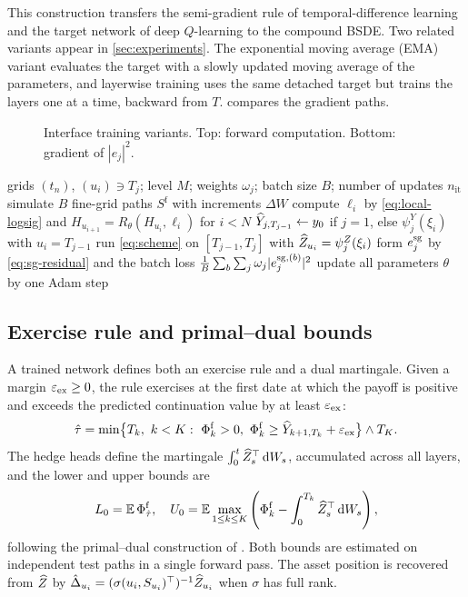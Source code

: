 This construction transfers the semi-gradient rule of temporal-difference learning and the target network of deep $Q$-learning \cite{sutton2018,mnih2015} to the compound BSDE. Two related variants appear in \cref{sec:experiments}. The exponential moving average (EMA) variant evaluates the target with a slowly updated moving average of the parameters, and layerwise training uses the same detached target but trains the layers one at a time, backward from $T$.  compares the gradient paths.

\begin{figure}[htbp]
\centering
\resizebox{\textwidth}{!}{}
\caption{Interface training variants. Top: forward computation. Bottom: gradient of $|e_j|^2$.}
\label{fig:interface}
\end{figure}

\begin{algorithm}[htbp]
\caption{Stop-gradient training of the log-signature compound BSDE}
\label{alg:train}
\begin{algorithmic}[1]
\Require grids $(t_n)$, $(u_i)\ni T_j$; level $M$; weights $\omega_j$; batch size $B$; number of updates $n_{\mathrm{it}}$
  \State simulate $B$ fine-grid paths $S^{\mathrm f}$ with increments $\Delta W$
  \State compute $\ell_i$ by \eqref{eq:local-logsig} and $H_{u_{i+1}}=R_\theta(H_{u_i},\ell_i)$ for $i<N$
    \State $\widehat Y_{j,T_{j-1}}\gets y_0$ if $j=1$, else $\psi^Y_j(\xi_i)$ with $u_i=T_{j-1}$
    \State run \eqref{eq:scheme} on $[T_{j-1},T_j]$ with $\widehat Z_{u_i}=\psi^Z_j(\xi_i)$
  \EndFor
  \State form $e^{\operatorname{sg}}_j$ by \eqref{eq:sg-residual} and the batch loss $\frac1B\sum_b\sum_j\omega_j\lvert e^{\operatorname{sg},(b)}_j\rvert^2$
  \State update all parameters $\theta$ by one Adam step
\EndFor
\end{algorithmic}
\end{algorithm}

\subsection{Exercise rule and primal--dual bounds}\label{sec:certificates}

A trained network defines both an exercise rule and a dual martingale. Given a margin $\varepsilon_{\mathrm{ex}}\ge0$, the rule exercises at the first date at which the payoff is positive and exceeds the predicted continuation value by at least $\varepsilon_{\mathrm{ex}}$:
\[
\hat\tau=\min\bigl\{T_k,\ k<K:\ \Phi^{\mathrm f}_k>0,\ \Phi^{\mathrm f}_k\ge\widehat Y_{k+1,T_k}+\varepsilon_{\mathrm{ex}}\bigr\}\wedge T_K .
\]
The hedge heads define the martingale $\int_0^t\widehat Z_s^\top\,\mathrm{d} W_s$, accumulated across all layers, and the lower and upper bounds are
\begin{equation}\label{eq:bounds}
L_0=\mathbb{E}\,\Phi^{\mathrm f}_{\hat\tau},\quad
U_0=\mathbb{E}\max_{1\le k\le K}\left(\Phi^{\mathrm f}_k-\int_0^{T_k}\widehat Z_s^\top\,\mathrm{d} W_s\right),
\end{equation}
following the primal--dual construction of \cite{rogers2002,haugh2004}. Both bounds are estimated on independent test paths in a single forward pass. The asset position is recovered from $\widehat Z$ by $\hat\Delta_{u_i}=(\sigma(u_i,S_{u_i})^\top)^{-1}\widehat Z_{u_i}$ when $\sigma$ has full rank.

